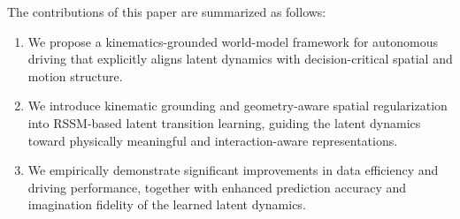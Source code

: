 





The contributions of this paper are summarized as follows:
\begin{enumerate}
    \item We propose a kinematics-grounded world-model framework for autonomous driving that explicitly aligns latent dynamics with decision-critical spatial and motion structure.

    \item We introduce kinematic grounding and geometry-aware spatial regularization into RSSM-based latent transition learning, guiding the latent dynamics toward physically meaningful and interaction-aware representations.

    \item We empirically demonstrate significant improvements in data efficiency and driving performance, together with enhanced prediction accuracy and imagination fidelity of the learned latent dynamics.
\end{enumerate}


